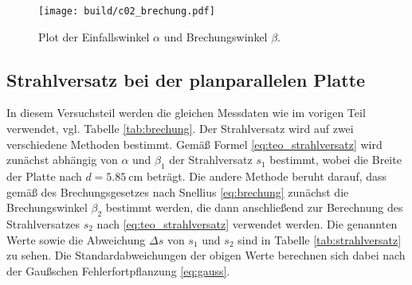 \begin{figure}[H]
    \centering
    \texttt{[image: build/c02\_brechung.pdf]}
    \caption[]{Plot der Einfallswinkel $\alpha$ und Brechungswinkel $\beta$.}
    \label{fig:brechung}
\end{figure}






\subsection{Strahlversatz bei der planparallelen Platte}
\label{sec:ausw_strahlversatz}
In diesem Versuchsteil werden die gleichen Messdaten wie im vorigen Teil verwendet, vgl. Tabelle \ref{tab:brechung}.
Der Strahlversatz wird auf zwei verschiedene Methoden bestimmt.
Gemäß Formel \eqref{eq:teo_strahlversatz} wird zunächst abhängig von $\alpha$ und $\beta_1$ der Strahlversatz $s_1$ bestimmt,
wobei die Breite der Platte nach \cite[]{man:v400} $d = \qty[]{5.85}{\cm}$ beträgt.
Die andere Methode beruht darauf, dass gemäß des Brechungsgesetzes nach Snellius \eqref{eq:brechung} zunächst die Brechungswinkel
$\beta_2$ bestimmt werden, die dann anschließend zur Berechnung des Strahlversatzes $s_2$ nach \eqref{eq:teo_strahlversatz} verwendet werden.
Die genannten Werte sowie die Abweichung $\Delta s$ von $s_1$ und $s_2$ sind in Tabelle \ref{tab:strahlversatz} zu sehen.
Die Standardabweichungen der obigen Werte berechnen sich dabei nach der Gaußschen Fehlerfortpflanzung \eqref{eq:gauss}.

